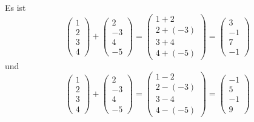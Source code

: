 \begin{beispiel} Es ist
 	$$ \left( \begin{matrix} 1 \\ 2 \\ 3 \\ 4 \end{matrix} \right) 
	+ \left( \begin{matrix} 2 \\ -3 \\ 4 \\ -5 \end{matrix} \right)
	= \left( \begin{matrix} 1 + 2 \\ 2 + (-3) \\ 3 + 4 
   	\\ 4 + (-5) \end{matrix} \right) = \left( \begin{matrix} 3 \\ -1 \\ 7 
   	\\ -1 \end{matrix} \right) $$
und 
 	$$\left( \begin{matrix} 1 \\ 2 \\ 3 \\ 4 \end{matrix} \right) 
	+ \left( \begin{matrix} 2 \\ -3 \\ 4 \\ -5 \end{matrix} \right)
	= \left( \begin{matrix} 1 - 2 \\ 2 - (-3) \\ 3 - 4 
   	\\ 4 - (-5) \end{matrix} \right) = \left( \begin{matrix} -1 \\ 5 \\ -1 
   	\\ 9 \end{matrix} \right) $$


\end{beispiel}
